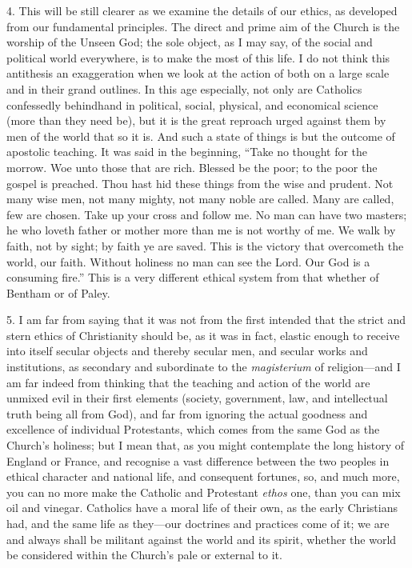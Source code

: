 4. This will be still clearer as we examine the
details of our ethics, as developed from our fundamental principles.
The direct and prime aim of the Church is the worship of the Unseen
God; the sole object, as I may say, of the social and political world
everywhere, is to make the most of this life. I do not think this
antithesis an exaggeration when we look at the action of both on a
large scale and in their grand outlines. In this age especially, not
only are Catholics confessedly behindhand in political, social,
physical, and economical science (more than they need be), but it is
the great reproach urged against them by men of the world that so it
is. And such a state of things is but the outcome of apostolic
teaching. It was said in the beginning, ``Take no thought for the
morrow. Woe unto those that are rich. Blessed be the poor; to the poor
the gospel is preached. Thou hast hid these things from the wise and
prudent. Not many wise men, not many mighty, not many noble are
called. Many are called, few are chosen. Take up your cross and follow
me. No man can have two masters; he who loveth father or mother more
than me is not worthy of me. We walk by faith, not by sight; by faith
ye are saved. This is the victory that overcometh the world, our
faith. Without holiness no man can see the Lord. Our God is a
consuming fire.'' This is a very different ethical system from that
whether of Bentham or of Paley.

5. I am far from saying that it was not from the
first intended that the strict and stern ethics of Christianity should
be, as it was in fact, elastic enough to receive into itself secular
objects and thereby secular men, and secular works and institutions,
as secondary and subordinate to the \emph{magisterium} of
religion—and I am far indeed from thinking that the teaching
and action of the world are unmixed evil in their first elements
(society, government, law, and intellectual truth being all from God),
and far from ignoring the actual goodness and excellence of individual
Protestants, which comes from the same God as the Church's holiness;
but I mean that, as you might contemplate the long history of England
or France, and recognise a vast difference between the two peoples in
ethical character and national life, and consequent fortunes, so, and
much more, you can no more make the Catholic and Protestant \emph{ethos}
one, than you can mix oil and vinegar. Catholics have a moral life of
their own, as the early Christians had, and the same life as
they—our doctrines and practices come of it; we are and always shall
be militant against the world and its spirit, whether the world be
considered within the Church's pale or external to it.


